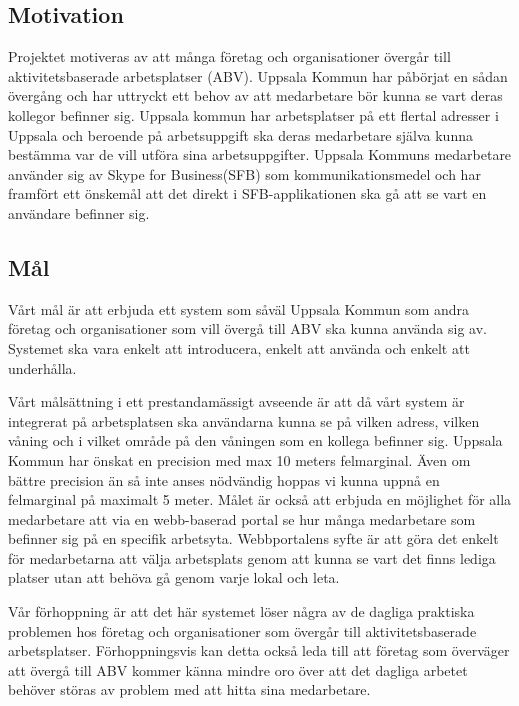 \documentclass[swedish, a4paper,12pt]{article}
\begin{document}
\subsection{Motivation}
Projektet motiveras av att många företag och organisationer övergår till aktivitetsbaserade arbetsplatser (ABV). Uppsala Kommun har påbörjat en sådan övergång och har uttryckt ett behov av att medarbetare bör kunna se vart deras kollegor befinner sig. Uppsala kommun har arbetsplatser på ett flertal adresser i Uppsala och beroende på arbetsuppgift ska deras medarbetare själva kunna bestämma var de vill utföra sina arbetsuppgifter. Uppsala Kommuns medarbetare använder sig av Skype for Business(SFB) som kommunikationsmedel och har framfört ett önskemål att det direkt i SFB-applikationen ska gå att se vart en användare befinner sig.

\subsection{Mål}

Vårt mål är att erbjuda ett system som såväl Uppsala Kommun som andra företag och organisationer som vill övergå till ABV ska kunna använda sig av. Systemet ska vara enkelt att introducera, enkelt att använda och enkelt att underhålla.

Vårt målsättning i ett prestandamässigt avseende är att då vårt system är integrerat på arbetsplatsen ska användarna kunna se på vilken adress, vilken våning och i vilket område på den våningen som en kollega befinner sig. Uppsala Kommun har önskat en precision med max 10 meters felmarginal. Även om bättre precision än så inte anses nödvändig hoppas vi kunna uppnå en felmarginal på maximalt 5 meter. Målet är också att erbjuda en möjlighet för alla medarbetare att via en webb-baserad portal se hur många medarbetare som befinner sig på en specifik arbetsyta. Webbportalens syfte är att göra det enkelt för medarbetarna att välja arbetsplats genom att kunna se vart det finns lediga platser utan att behöva gå genom varje lokal och leta.

Vår förhoppning är att det här systemet löser några av de dagliga praktiska problemen hos företag och organisationer som övergår till aktivitetsbaserade arbetsplatser. Förhoppningsvis kan detta också leda till att företag som överväger att övergå till ABV kommer känna mindre oro över att det dagliga arbetet behöver störas av problem med att hitta sina medarbetare.
\end{document}
